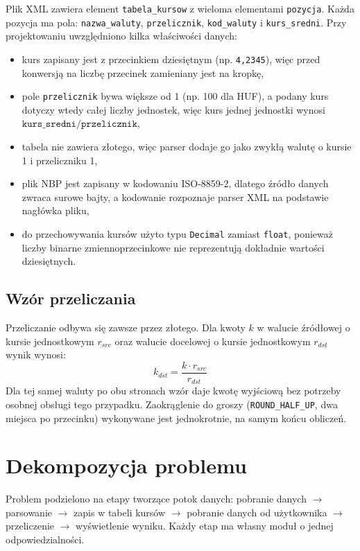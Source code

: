 \documentclass[12pt,a4paper]{article}
\begin{document}
Plik XML zawiera element \texttt{tabela\_kursow} z wieloma elementami \texttt{pozycja}. Każda pozycja ma pola: \texttt{nazwa\_waluty}, \texttt{przelicznik}, \texttt{kod\_waluty} i \texttt{kurs\_sredni}. Przy projektowaniu uwzględniono kilka właściwości danych:
\begin{itemize}
    \item kurs zapisany jest z przecinkiem dziesiętnym (np. \texttt{4,2345}), więc przed konwersją na liczbę przecinek zamieniany jest na kropkę,
    \item pole \texttt{przelicznik} bywa większe od 1 (np. 100 dla HUF), a podany kurs dotyczy wtedy całej liczby jednostek, więc kurs jednej jednostki wynosi $\texttt{kurs\_sredni} / \texttt{przelicznik}$,
    \item tabela nie zawiera złotego, więc parser dodaje go jako zwykłą walutę o kursie 1 i przeliczniku 1,
    \item plik NBP jest zapisany w kodowaniu ISO-8859-2, dlatego źródło danych zwraca surowe bajty, a kodowanie rozpoznaje parser XML na podstawie nagłówka pliku,
    \item do przechowywania kursów użyto typu \texttt{Decimal} zamiast \texttt{float}, ponieważ liczby binarne zmiennoprzecinkowe nie reprezentują dokładnie wartości dziesiętnych.
\end{itemize}

\subsection*{Wzór przeliczania}

Przeliczanie odbywa się zawsze przez złotego. Dla kwoty $k$ w walucie źródłowej o kursie jednostkowym $r_{src}$ oraz walucie docelowej o kursie jednostkowym $r_{dst}$ wynik wynosi:
\begin{equation}
    k_{dst} = \frac{k \cdot r_{src}}{r_{dst}}
\end{equation}
Dla tej samej waluty po obu stronach wzór daje kwotę wyjściową bez potrzeby osobnej obsługi tego przypadku. Zaokrąglenie do groszy (\texttt{ROUND\_HALF\_UP}, dwa miejsca po przecinku) wykonywane jest jednokrotnie, na samym końcu obliczeń.

\section{Dekompozycja problemu}

Problem podzielono na etapy tworzące potok danych: pobranie danych $\rightarrow$ parsowanie $\rightarrow$ zapis w tabeli kursów $\rightarrow$ pobranie danych od użytkownika $\rightarrow$ przeliczenie $\rightarrow$ wyświetlenie wyniku. Każdy etap ma własny moduł o jednej odpowiedzialności.
\end{document}
